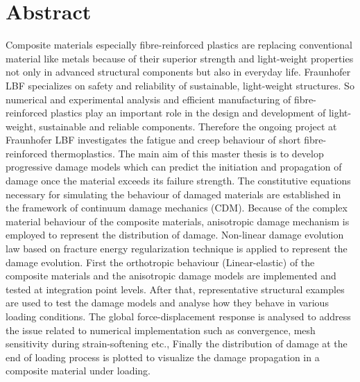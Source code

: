 \documentclass[12pt,a4paper,twoside,openright]{report}
\begin{document}


\clearpage
\thispagestyle{empty}
\hfill
\clearpage
{}
\vspace*{2cm}
\section*{\LARGE{Abstract} }
\indent\indent\indent Composite materials especially fibre-reinforced plastics are replacing conventional material like metals because of their superior strength and light-weight properties not only in advanced structural components but also in everyday life. Fraunhofer LBF specializes on safety and reliability of sustainable, light-weight structures. So numerical and experimental analysis and efficient manufacturing of fibre-reinforced plastics play an important role in the design and development of light-weight, sustainable and reliable components. Therefore the ongoing project at Fraunhofer LBF investigates the fatigue and creep behaviour of short fibre-reinforced thermoplastics. The main aim of this master thesis is to develop progressive damage models which can predict the initiation and propagation of damage once the material exceeds its failure strength. The constitutive equations necessary for simulating the behaviour of damaged materials are established in the framework of continuum damage mechanics (CDM). Because of the complex material behaviour of the composite materials, anisotropic damage mechanism is employed to represent the distribution of damage. Non-linear damage evolution law based on fracture energy regularization technique is applied to represent the damage evolution.  First the orthotropic behaviour (Linear-elastic) of the composite materials and the anisotropic damage models are implemented and tested at integration point levels. After that, representative structural examples are used to test the damage models and analyse how they behave in various loading conditions. The global force-displacement response is analysed to address the issue related to numerical implementation such as convergence, mesh sensitivity during strain-softening etc., Finally the distribution of damage at the end of loading process is plotted to visualize the damage propagation in a composite material under loading.

\clearpage
\thispagestyle{empty}
\hfill
\clearpage
\vspace*{2cm}
\end{document}
